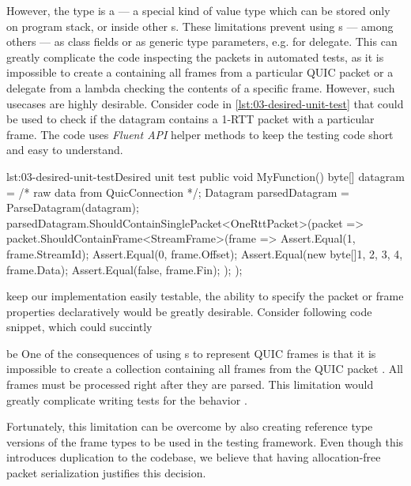 However, the  type is a  --- a special kind of value type which can
be stored only on program stack, or inside other s. These limitations prevent
using s --- among others --- as class fields or as generic type parameters, e.g. for
 delegate. This can greatly complicate the code inspecting the packets in automated
tests, as it is impossible to create a  containing all frames from a particular QUIC
packet or a  delegate from a lambda checking the contents of a specific frame.
However, such usecases are highly desirable. Consider code in \autoref{lst:03-desired-unit-test}
that could be used to check if the datagram contains a 1-RTT packet with a particular \STREAM{}
frame. The code uses \textit{Fluent API} helper methods to keep the testing code short and easy to
understand.

\begin{myListing}{lst:03-desired-unit-test}{Desired unit test}
  public void MyFunction() {
    byte[] datagram = /* raw data from QuicConnection */;
    Datagram parsedDatagram = ParseDatagram(datagram);
    parsedDatagram.ShouldContainSinglePacket<OneRttPacket>(packet => {
      packet.ShouldContainFrame<StreamFrame>(frame => {
        Assert.Equal(1, frame.StreamId);
        Assert.Equal(0, frame.Offset);
        Assert.Equal(new byte[]{1, 2, 3, 4}, frame.Data);
        Assert.Equal(false, frame.Fin);
      });
    });
  }
\end{myListing}

keep our implementation easily testable, the ability to specify the packet or frame properties
declaratively would be greatly desirable. Consider following code snippet, which could succintly

be  One of the consequences of using s to represent QUIC frames is
that it is impossible to create a collection containing all frames from the QUIC packet
. All frames must be processed right after they are parsed. This limitation would
greatly complicate writing tests for the  behavior .


Fortunately, this limitation can be overcome by
also creating reference type versions of the frame types to be used in the testing framework. Even
though this introduces duplication to the codebase, we believe that having allocation-free packet
serialization justifies this decision.

